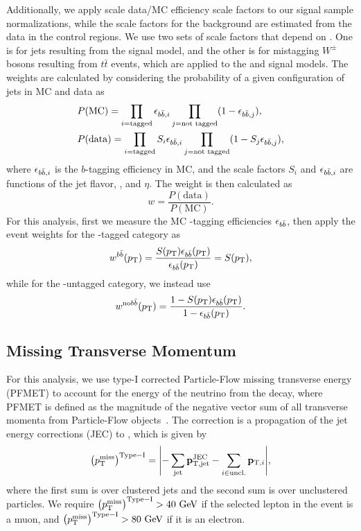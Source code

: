 Additionally, we apply scale data/MC efficiency scale factors to our signal sample normalizations, while the scale factors for the background are estimated from the data in the control regions.
We use two sets of scale factors that depend on \ptjet.
One is for \Htobbbar jets resulting from the \WprtoWHtolnubbbar signal model, and the other is for mistagging $W^\pm$ bosons resulting from $t\bar{t}$ events, which are applied to the \GBulktoWWtolnuqqbarpr and \WprtoWZtolnuqqbar signal models.
The weights are calculated by considering the probability of a given configuration of jets in MC and data as
\begin{align}
  & P(\mathrm{MC})=\prod_{i=\text{tagged}}\epsilon_{b\bar{b},i}\prod_{j=\text{not tagged}}(1-\epsilon_{b\bar{b},j}),\\
  & P(\mathrm{data})=\prod_{i=\text{tagged}}S_i\epsilon_{b\bar{b},i}\prod_{j=\text{not tagged}}(1-S_j\epsilon_{b\bar{b},j}),
\end{align}
where $\epsilon_{b\bar{b},i}$ is the $b$-tagging efficiency in MC, and the scale factors $S_i$ and $\epsilon_{b\bar{b},i}$ are functions of the jet flavor, \pt, and $\eta$.
The weight is then calculated as
\begin{equation}
  w=\frac{P(\mathrm{data})}{P(\mathrm{MC})}.
\end{equation}
For this analysis, first we measure the MC \bbbar-tagging efficiencies $\epsilon_{b\bar{b}}$, then apply the event weights for the \bbbar-tagged category as
\begin{equation}
  w^{b\bar{b}}(p_\mathrm{T})=\frac{S(p_\mathrm{T})\epsilon_{b\bar{b}}(p_\mathrm{T})}{\epsilon_{b\bar{b}}(p_\mathrm{T})}=S(p_\mathrm{T}),
\end{equation}
while for the \bbbar-untagged category, we instead use
\begin{equation}
  w^{\mathrm{no}b\bar{b}}(p_\mathrm{T})=\frac{1-S(p_\mathrm{T})\epsilon_{b\bar{b}}(p_\mathrm{T})}{1-\epsilon_{b\bar{b}}(p_\mathrm{T})}.
\end{equation}

\subsection{Missing Transverse Momentum}

For this analysis, we use type-I corrected Particle-Flow missing transverse energy (PFMET) to account for the energy of the neutrino from the \Wlep decay, where PFMET is defined as the magnitude of the negative vector sum of all transverse momenta from Particle-Flow objects~\cite{Sirunyan:2019kia}.
The correction is a propagation of the jet energy corrections (JEC) to \ptmiss, which is given by
\begin{equation}
  \ptmissTI=\vqty{-\sum_\mathrm{jet}\vb{p}_\mathrm{T,jet}^\mathrm{JEC}-\sum_{i\in\mathrm{uncl.}}\vb{p}_{\mathrm{T},i}},
\end{equation}
where the first sum is over clustered jets and the second sum is over unclustered particles.
We require $\ptmissTI>40\unit{GeV}$ if the selected lepton in the event is a muon, and $\ptmissTI>80\unit{GeV}$ if it is an electron.

